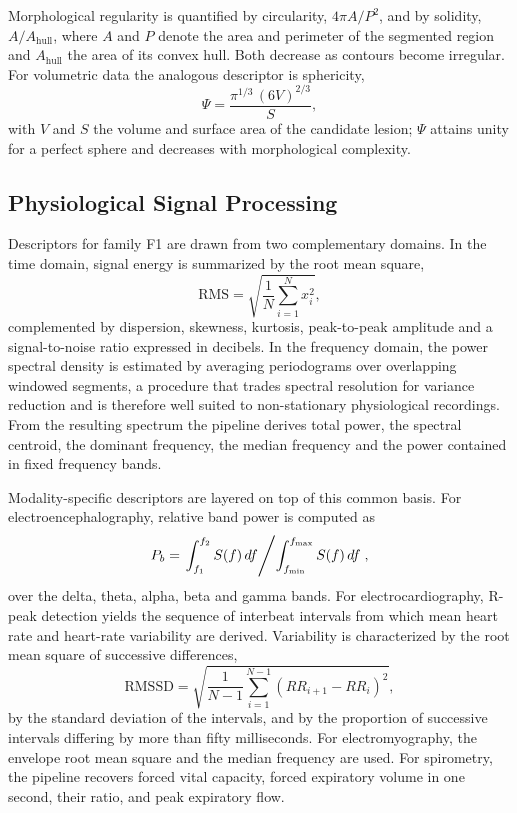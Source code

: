 Morphological regularity is quantified by circularity, $4\pi A / P^{2}$, and by solidity,
$A / A_{\text{hull}}$, where $A$ and $P$ denote the area and perimeter of the segmented region and
$A_{\text{hull}}$ the area of its convex hull. Both decrease as contours become irregular. For
volumetric data the analogous descriptor is sphericity,
\begin{equation}
    \Psi = \frac{\pi^{1/3}\,(6V)^{2/3}}{S},
    \label{eq:esfericidade}
\end{equation}
with $V$ and $S$ the volume and surface area of the candidate lesion; $\Psi$ attains unity for a
perfect sphere and decreases with morphological complexity.

\subsection{Physiological Signal Processing}
\label{subsec:sinais}

Descriptors for family F1 are drawn from two complementary domains. In the time domain, signal
energy is summarized by the root mean square,
\begin{equation}
    \mathrm{RMS} = \sqrt{\frac{1}{N}\sum_{i=1}^{N} x_i^{2}},
    \label{eq:rms}
\end{equation}
complemented by dispersion, skewness, kurtosis, peak-to-peak amplitude and a signal-to-noise ratio
expressed in decibels. In the frequency domain, the power spectral density is estimated by averaging
periodograms over overlapping windowed segments, a procedure that trades spectral resolution for
variance reduction and is therefore well suited to non-stationary physiological
recordings. From the resulting spectrum the pipeline derives
total power, the spectral centroid, the dominant frequency, the median frequency and the power
contained in fixed frequency bands.

Modality-specific descriptors are layered on top of this common basis. For electroencephalography,
relative band power is computed as
\begin{equation}
    P_b = \left. \int_{f_1}^{f_2} S(f)\,df \middle/ \int_{f_{\min}}^{f_{\max}} S(f)\,df \right.,
    \label{eq:banda}
\end{equation}
over the delta, theta, alpha, beta and gamma bands. For electrocardiography, R-peak detection yields
the sequence of interbeat intervals from which mean heart rate and heart-rate variability are
derived. Variability is characterized by the root mean square of successive differences,
\begin{equation}
    \mathrm{RMSSD} = \sqrt{\frac{1}{N-1}\sum_{i=1}^{N-1}\left(RR_{i+1}-RR_{i}\right)^{2}},
    \label{eq:rmssd}
\end{equation}
by the standard deviation of the intervals, and by the proportion of successive intervals differing
by more than fifty milliseconds. For electromyography, the
envelope root mean square and the median frequency are used. For spirometry, the pipeline recovers
forced vital capacity, forced expiratory volume in one second, their ratio, and peak expiratory
flow.

